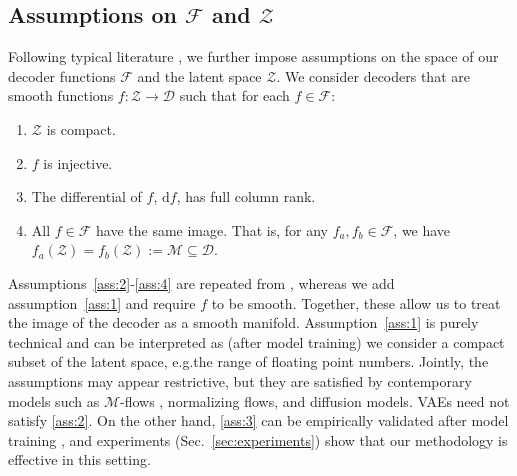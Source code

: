 

\subsection{Assumptions on $\mathcal{F}$ and $\mathcal{Z}$} 

Following typical literature \cite{xi2023indeterminacy,8575533}, we further impose assumptions on the space of our decoder functions $\mathcal{F}$ and the latent space $\mathcal{Z}$. We consider decoders that are smooth functions $f: \mathcal{Z} \rightarrow \mathcal{D}$ such that for each $f \in \mathcal{F}$:
\begin{enumerate}[label=\textbf{A\arabic*},ref=A\arabic*]
    \item $\mathcal{Z}$ is compact. \label{ass:1}
    \item $f$ is injective. \label{ass:2}
    \item The differential of $f$, $\mathrm{d}f$, has full column rank. \label{ass:3}
    \item All $f \in \mathcal{F}$ have the same image. That is, for any $f_a, f_b \in \mathcal{F}$, we have $f_a(\mathcal{Z}) = f_b(\mathcal{Z}) := \mathcal{M} \subseteq \mathcal{D}$. \label{ass:4}
\end{enumerate}

Assumptions~\ref{ass:2}-\ref{ass:4} are repeated from \citeauthor{xi2023indeterminacy}, whereas we add assumption~\ref{ass:1} and require $f$ to be smooth. Together, these allow us to treat the image of the decoder as a smooth manifold. Assumption~\ref{ass:1} is purely technical and can be interpreted as (after model training) we consider a compact subset of the latent space, e.g.\@ the range of floating point numbers.
%
%
Jointly, the assumptions may appear restrictive, but they are satisfied by contemporary models such as $\mathcal{M}$-flows \citep{brehmer2020flows}, normalizing flows, and diffusion models. VAEs need not satisfy \ref{ass:2}. On the other hand, \ref{ass:3} can be empirically validated after model training \citep{8575533}, and experiments (Sec.~\ref{sec:experiments}) show that our methodology is effective in this setting.

